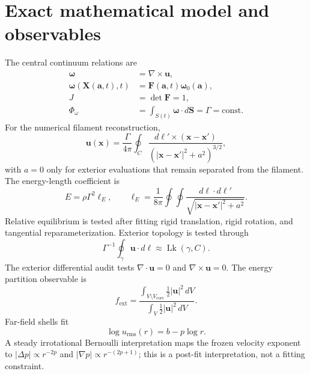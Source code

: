\documentclass[11pt,a4paper]{article}
\newcommand{\vort}{\boldsymbol{\omega}}
\newcommand{\vel}{\mathbf{u}}
\newcommand{\Fmat}{\mathbf{F}}
\begin{document}
\section{Exact mathematical model and observables}
The central continuum relations are
\begin{align}
\vort &= \nabla\times\vel, \\
\vort(\mathbf{X}(\mathbf{a},t),t) &= \Fmat(\mathbf{a},t)\vort_0(\mathbf{a}), \\
J&=\det\Fmat=1, \\
\Phi_\omega&=\int_{S(t)}\vort\cdot d\mathbf{S}=\Gamma=\mathrm{const}. 
\end{align}
For the numerical filament reconstruction,
\begin{equation}
\vel(\mathbf{x})=\frac{\Gamma}{4\pi}\oint_C
\frac{d\boldsymbol{\ell}'\times(\mathbf{x}-\mathbf{x}')}{(|\mathbf{x}-\mathbf{x}'|^2+a^2)^{3/2}},
\end{equation}
with $a=0$ only for exterior evaluations that remain separated from the filament. The energy-length coefficient is
\begin{equation}
E=\rho\Gamma^2\ell_E,\qquad
\ell_E=\frac{1}{8\pi}\oint\!\oint
\frac{d\boldsymbol{\ell}\cdot d\boldsymbol{\ell}'}{\sqrt{|\mathbf{x}-\mathbf{x}'|^2+a^2}}.
\end{equation}
Relative equilibrium is tested after fitting rigid translation, rigid rotation, and tangential reparameterization. Exterior topology is tested through
\begin{equation}
\Gamma^{-1}\oint_\gamma\vel\cdot d\boldsymbol{\ell}\approx \operatorname{Lk}(\gamma,C).
\end{equation}
The exterior differential audit tests $\nabla\cdot\vel=0$ and $\nabla\times\vel=0$. The energy partition observable is
\begin{equation}
f_{\mathrm{ext}}=
\frac{\int_{V\setminus V_{\mathrm{core}}}\frac12|\vel|^2\,dV}
{\int_V\frac12|\vel|^2\,dV}.
\end{equation}
Far-field shells fit
\begin{equation}
\log u_{\mathrm{rms}}(r)=b-p\log r.
\end{equation}
A steady irrotational Bernoulli interpretation maps the frozen velocity exponent to $|\Delta p|\propto r^{-2p}$ and $|\nabla p|\propto r^{-(2p+1)}$; this is a post-fit interpretation, not a fitting constraint.

\end{document}

